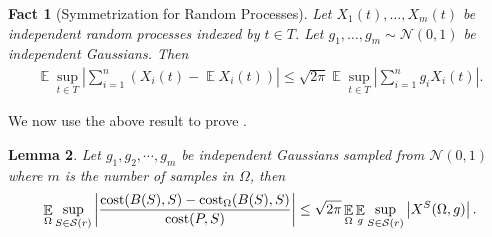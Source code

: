 \documentclass[11pt]{article}
\newtheorem{lemma}{Lemma}[section]
\newtheorem{fact}[lemma]{Fact}
\theoremstyle{restate}
\theoremstyle{definition}
\newcommand{\E}{\mathop{\mathbb{E}}}
\newcommand{\cost}{\textnormal{cost}}
\newcommand{\costom}{\cost_\Omega} %
\newcommand{\csize}{m}
\newcommand{\inSR}{\in \mathcal{S}(r)}
\begin{document}
\begin{fact}[Symmetrization for Random Processes] \label{lem: symmetrization} Let $X_1(t), \ldots, X_m(t)$ be independent random processes indexed by $t \in T $. Let $g_1, \dots, g_m \sim \mathcal{N}(0,1)$ be independent Gaussians. Then
	\begin{align*}
		\E \sup_{t \in T} \left\lvert\sum_{i = 1}^n (X_i(t) - \E X_i(t))\right\rvert \leq \sqrt{2 \pi} \E  \sup_{t \in T} \left\lvert\sum_{i = 1}^n g_i X_i(t) \right\rvert.
	\end{align*}
\end{fact}
\noindent We now use the above result to prove . 
\begin{lemma}\label{lem: sym-apply}
	Let $g_1, g_2, \cdots, g_\csize$ be independent Gaussians sampled from $\mathcal{N}(0,1)$ where $\csize$ is the number of samples in $\Omega$, then
	\begin{align*}
		\E_{ \Omega} \sup_{S\inSR} \left\lvert \frac{ \cost(B(S), S)- \costom(B(S),S)}{\cost(P,S) }\right\rvert \leq \sqrt{2\pi} \E_{ \Omega} \E_{g} \sup_{S\inSR} \left\lvert X^{S}(\Omega,g)\right\rvert.
	\end{align*}
\end{lemma}
\end{document}
